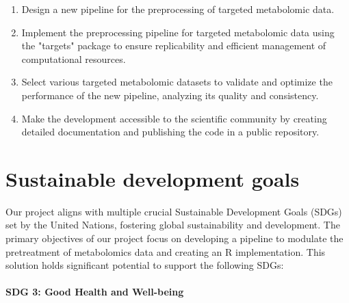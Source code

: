 \documentclass[ENG, BIB]{TFUOC}%
\begin{document}
\begin{enumerate}
\item Design a new pipeline for the preprocessing of targeted metabolomic data.
\item Implement the preprocessing pipeline for targeted metabolomic data using the "targets" package to ensure replicability and efficient management of computational resources.
\item Select various targeted metabolomic datasets to validate and optimize the performance of the new pipeline, analyzing its quality and consistency.
\item Make the development accessible to the scientific community by creating detailed documentation and publishing the code in a public repository.
\end{enumerate}




\chapter{Sustainable development goals}
\label{s:etic}

 Our project aligns with multiple crucial Sustainable Development Goals (SDGs) set by the United Nations, fostering global sustainability and development. The primary objectives of our project focus on developing a pipeline to modulate the pretreatment of metabolomics data and creating an R implementation. This solution holds significant potential to support the following SDGs:  
 
\subsubsection{SDG 3: Good Health and Well-being} 
 
\end{document}
